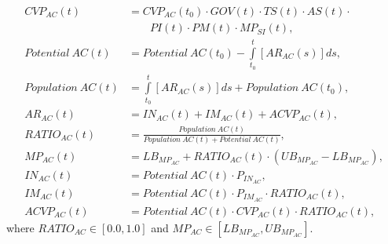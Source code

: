 \begin{align}
		CVP_{AC}(t) &= CVP_{AC}(t_0) \cdot GOV(t) \cdot TS(t) \cdot AS(t) \cdot \nonumber \\ &\qquad PI(t) \cdot PM(t) \cdot MP_{SI}(t),\\
		\mathit{Potential~AC(t)} &= \mathit{Potential~AC(t_0)} - \int\limits_{t_0}^t  [AR_{AC}(s)]ds,\\
		\mathit{Population~AC(t)} &= \int\limits_{t_0}^t [AR_{AC}(s)]ds + \mathit{Population~AC(t_0)},\\
		AR_{AC}(t) &= IN_{AC}(t) + IM_{AC}(t) + ACVP_{AC}(t),\\
		RATIO_{AC}(t) &= \frac{\mathit{Population~AC(t)}}{\mathit{Population~AC(t)} + \mathit{Potential~AC(t)}},\\
		MP_{AC}(t) &= LB_{MP_{AC}} + RATIO_{AC}(t) \cdot (UB_{MP_{AC}} - LB_{MP_{AC}}),\\
		IN_{AC}(t) &= \mathit{Potential~AC(t)} \cdot P_{IN_{AC}},\\
		IM_{AC}(t) &= \mathit{Potential~AC(t)} \cdot P_{IM_{AC}} \cdot RATIO_{AC}(t),\\
		ACVP_{AC}(t) &= \mathit{Potential~AC(t)} \cdot CVP_{AC}(t) \cdot RATIO_{AC}(t),
\end{align}
where $RATIO_{AC} \in [0.0,1.0]$ and $MP_{AC} \in [LB_{MP_{AC}},UB_{MP_{AC}}]$.